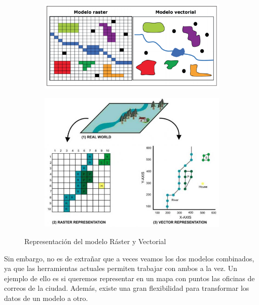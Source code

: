 \begin{figure}[H]
	\centering
	\begin{subfigure}[h]{0.71\textwidth} 
		\includegraphics[width=\textwidth]{imagenes/capitulo2/raster-vectorial}
		\caption{}
	\end{subfigure}       
	\begin{subfigure}[h]{0.76\textwidth} 
		\includegraphics[width=\textwidth]{imagenes/capitulo2/raster-vector-gis-i4}
		\caption{}
	\end{subfigure}
	\caption{Representación del modelo Ráster y Vectorial \cite{imagen2-52, imagen-2.51}}
	\label{fig:raster-vectorial}
\end{figure}

Sin embargo, no es de extrañar que a veces veamos los dos modelos combinados, ya que las herramientas actuales permiten trabajar con ambos a la vez. Un ejemplo de ello es si queremos representar en un mapa con puntos las oficinas de correos de la ciudad. Además, existe una gran flexibilidad para transformar los datos de un modelo a otro.\\

